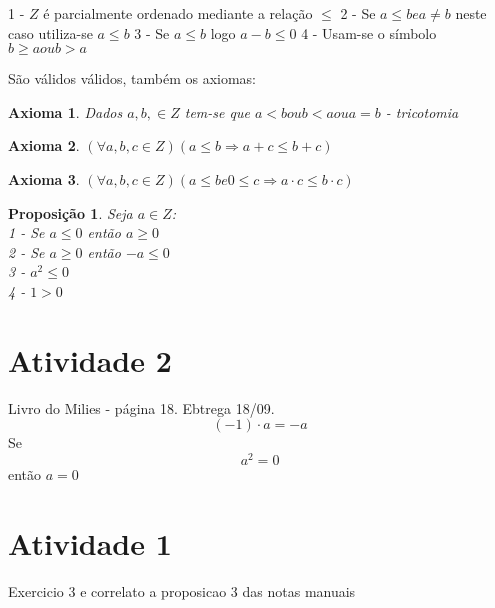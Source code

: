 \documentclass[a4paper,12pt]{article}
\newtheorem{prop}{Proposição}
\newtheorem{ax}{Axioma}
\begin{document}
1 - $Z$ é parcialmente ordenado mediante a relação $\leq$
2 - Se $a \leq b e a \neq b$ neste caso utiliza-se $a \leq b$
3 - Se $a \leq b$ logo $a - b \leq 0$
4 - Usam-se o símbolo $b \geq a ou b > a$


São válidos válidos, também os axiomas:

\begin{ax}
  Dados $a, b, \in Z$ tem-se que $a < b ou b < a ou a = b$ - tricotomia
\end{ax}

\begin{ax}
  $(\forall a, b, c \in Z)(a \leq b \Longrightarrow a + c \leq b + c)$
\end{ax}
\begin{ax}
  $(\forall a, b, c \in Z)(a \leq b e 0 \leq c \Longrightarrow a \cdot c \leq b \cdot c)$
\end{ax}

\begin{prop} %
  Seja $a \in Z$:\\
  1 - Se $a \leq 0$ então $a \geq 0$\\
  2 - Se $a \geq 0$ então $-a \leq 0$\\
  3 - $a^2 \leq 0$\\
  4 - $1 > 0$\\
\end{prop}

\section{Atividade 2}

Livro do Milies - página 18. Ebtrega 18/09.
\begin{equation} %
  (-1) \cdot a = -a
\end{equation}
Se 
\begin{equation} %
  a^2 = 0
\end{equation}
então $a = 0$

\section{Atividade 1}

Exercicio 3 e correlato a proposicao 3 das notas manuais

\nocite{*}


\end{document}
